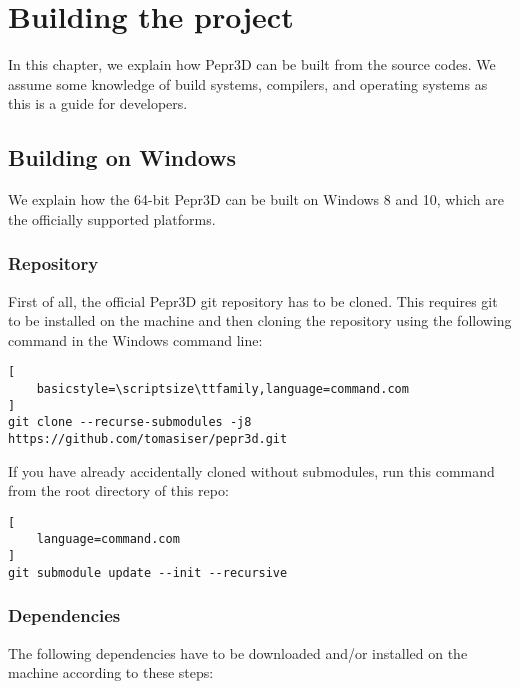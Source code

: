 \chapter{Building the project}
\label{ch:build}

In this chapter, we explain how Pepr3D can be built from the source codes.
We assume some knowledge of build systems, compilers, and operating systems as this is a guide for developers.

\section{Building on Windows}

We explain how the 64-bit Pepr3D can be built on Windows 8 and 10, which are the officially supported platforms.

\subsection{Repository}

First of all, the official Pepr3D git repository has to be cloned.
This requires git to be installed on the machine and then cloning the repository using the following command in the Windows command line:

\begin{lstlisting}[
    basicstyle=\scriptsize\ttfamily,language=command.com
]
git clone --recurse-submodules -j8 https://github.com/tomasiser/pepr3d.git
\end{lstlisting}

If you have already accidentally cloned without submodules, run this command from the root directory of this repo:

\begin{lstlisting}[
    language=command.com
]
git submodule update --init --recursive
\end{lstlisting}

\subsection{Dependencies}

The following dependencies have to be downloaded and/or installed on the machine according to these steps:

